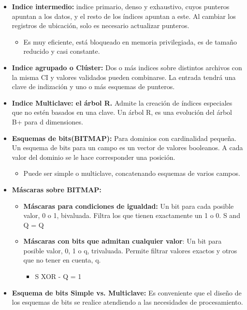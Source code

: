 \documentclass[12pt, twoside, openright]{report} %
\begin{document}
  \begin{itemize}
  \item \textbf{Indice intermedio:} indice primario, denso y exhaustivo,
    cuyos punteros apuntan a los datos, y el resto de los índices
    apuntan a este. Al cambiar los registros de ubicación, solo es
    necesario actualizar punteros.
    

    \begin{itemize}
    \item Es muy eficiente, está bloqueado en memoria privilegiada, es de
      tamaño reducido y casi constante.
      
    \end{itemize}
  \item \textbf{Indice agrupado o Clúster:} Dos o más indices sobre
    distintos archivos con la misma CI y valores validados pueden
    combinarse. La entrada tendrá una clave de indización y uno o más
    esquemas de punteros.
    
  \item \textbf{Indice Multiclave: el árbol R.} Admite la creación de
    índices especiales que no estén basados en una clave. Un árbol R, es
    una evolución del árbol B+ para d dimensiones.
    
  \item \textbf{Esquemas de bits(BITMAP):} Para dominios con cardinalidad
    pequeña. Un esquema de bits para un campo es un vector de valores
    booleanos. A cada valor del dominio se le hace corresponder una
    posición.
    

    \begin{itemize}
    \item Puede ser simple o multiclave, concatenando esquemas de varios
      campos.
      
    \end{itemize}
  \item \textbf{Máscaras sobre BITMAP:}
    

    \begin{itemize}
    \item \textbf{Máscaras para condiciones de igualdad:} Un bit para cada
      posible valor, 0 o 1, bivaluada. Filtra los que tienen exactamente
      un 1 o 0. S and Q = Q
      
    \item \textbf{Máscaras con bits que admitan cualquier valor}: Un bit
      para posible valor, 0, 1 o q, trivaluada. Permite filtrar valores
      exactos y otros que no tener en cuenta, q.
      

      \begin{itemize}
      \item S XOR - Q = 1
        
      \end{itemize}
    \end{itemize}
  \item \textbf{Esquema de bits Simple vs. Multiclave:} Es conveniente que
    el diseño de los esquemas de bits se realice atendiendo a las
    necesidades de procesamiento.
    
  \end{itemize}
\end{document}
